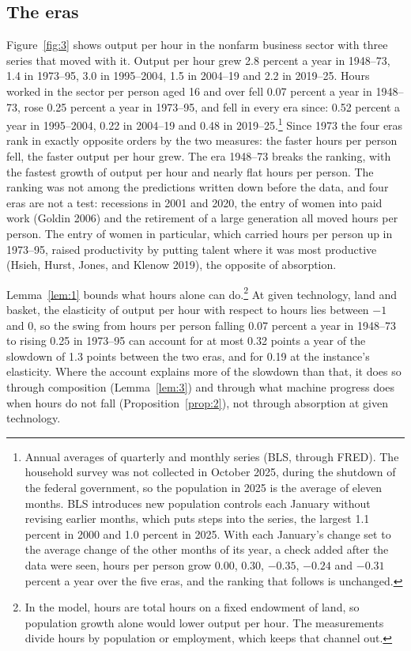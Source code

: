 \documentclass[12pt]{article}
\theoremstyle{plain}
\begin{document}
\subsection{The eras}\label{sec:5.1}

Figure~\ref{fig:3} shows output per hour in the nonfarm business sector with three series that moved with it. Output per hour grew 2.8 percent a year in 1948--73, 1.4 in 1973--95, 3.0 in 1995--2004, 1.5 in 2004--19 and 2.2 in 2019--25. Hours worked in the sector per person aged 16 and over fell 0.07 percent a year in 1948--73, rose 0.25 percent a year in 1973--95, and fell in every era since: 0.52 percent a year in 1995--2004, 0.22 in 2004--19 and 0.48 in 2019--25.\footnote{Annual averages of quarterly and monthly series (BLS, through FRED). The household survey was not collected in October 2025, during the shutdown of the federal government, so the population in 2025 is the average of eleven months. BLS introduces new population controls each January without revising earlier months, which puts steps into the series, the largest 1.1 percent in 2000 and 1.0 percent in 2025. With each January's change set to the average change of the other months of its year, a check added after the data were seen, hours per person grow 0.00, 0.30, $-0.35$, $-0.24$ and $-0.31$ percent a year over the five eras, and the ranking that follows is unchanged.} Since 1973 the four eras rank in exactly opposite orders by the two measures: the faster hours per person fell, the faster output per hour grew. The era 1948--73 breaks the ranking, with the fastest growth of output per hour and nearly flat hours per person. The ranking was not among the predictions written down before the data, and four eras are not a test: recessions in 2001 and 2020, the entry of women into paid work (Goldin 2006) and the retirement of a large generation all moved hours per person. The entry of women in particular, which carried hours per person up in 1973--95, raised productivity by putting talent where it was most productive (Hsieh, Hurst, Jones, and Klenow 2019), the opposite of absorption.

Lemma~\ref{lem:1} bounds what hours alone can do.\footnote{In the model, hours are total hours on a fixed endowment of land, so population growth alone would lower output per hour. The measurements divide hours by population or employment, which keeps that channel out.} At given technology, land and basket, the elasticity of output per hour with respect to hours lies between $-1$ and $0$, so the swing from hours per person falling 0.07 percent a year in 1948--73 to rising 0.25 in 1973--95 can account for at most 0.32 points a year of the slowdown of 1.3 points between the two eras, and for 0.19 at the instance's elasticity. Where the account explains more of the slowdown than that, it does so through composition (Lemma~\ref{lem:3}) and through what machine progress does when hours do not fall (Proposition~\ref{prop:2}), not through absorption at given technology.
\end{document}

